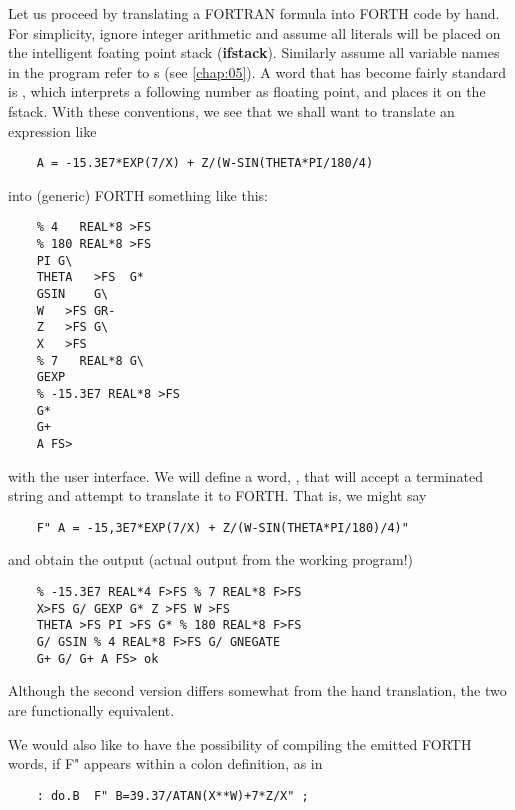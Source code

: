 Let us proceed by translating a FORTRAN formula into FORTH code by hand. For simplicity, ignore integer arithmetic and assume all literals will be placed on the intelligent foating point stack (\textbf{ifstack}). Similarly assume all variable names in the program refer to s (see \ref{chap:05}). A word that has become fairly standard is \bc{\%}, which interprets a following number as floating point, and places it on the fstack. With these conventions, we see that we shall want to translate an expression like

\begin{lstlisting}
    A = -15.3E7*EXP(7/X) + Z/(W-SIN(THETA*PI/180/4)
\end{lstlisting}

into (generic) FORTH something like this:

\begin{lstlisting}
    % 4   REAL*8 >FS
    % 180 REAL*8 >FS
    PI G\
    THETA   >FS  G*
    GSIN    G\
    W   >FS GR-
    Z   >FS G\
    X   >FS
    % 7   REAL*8 G\
    GEXP
    % -15.3E7 REAL*8 >FS
    G*
    G+
    A FS>
\end{lstlisting}

 with the user interface. We will define a word, , that will accept a terminated string and attempt to translate it to FORTH. That is, we might say

\begin{lstlisting}
    F" A = -15,3E7*EXP(7/X) + Z/(W-SIN(THETA*PI/180)/4)"
\end{lstlisting}

and obtain the output (actual output from the working program!)

\begin{lstlisting}
    % -15.3E7 REAL*4 F>FS % 7 REAL*8 F>FS
    X>FS G/ GEXP G* Z >FS W >FS
    THETA >FS PI >FS G* % 180 REAL*8 F>FS
    G/ GSIN % 4 REAL*8 F>FS G/ GNEGATE
    G+ G/ G+ A FS> ok
\end{lstlisting}

Although the second version differs somewhat from the hand translation, the two are functionally equivalent.

We would also like to have the possibility of compiling the emitted FORTH words, if F" appears within a colon definition, as in

\begin{lstlisting}
    : do.B  F" B=39.37/ATAN(X**W)+7*Z/X" ;
\end{lstlisting}

